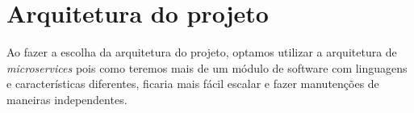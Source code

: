 




\section{Arquitetura do projeto}

Ao fazer a escolha da arquitetura do projeto, optamos utilizar a arquitetura de \textit{microservices} pois como teremos mais de um módulo de software com linguagens e características diferentes, ficaria mais fácil escalar e fazer manutenções de maneiras independentes.

